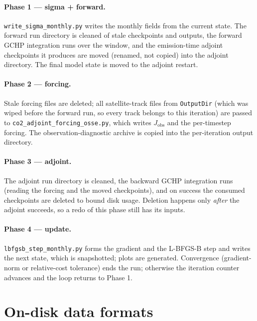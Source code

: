 \documentclass[11pt]{article}
\newcommand{\code}[1]{\texttt{#1}}
\begin{document}
\paragraph{Phase 1 --- sigma + forward.}
\code{write\_sigma\_monthly.py} writes the monthly fields from the current state.
The forward run directory is cleaned of stale checkpoints and outputs, the forward
GCHP integration runs over the window, and the emission-time adjoint checkpoints
it produces are moved (renamed, not copied) into the adjoint directory. The final
model state is moved to the adjoint restart.

\paragraph{Phase 2 --- forcing.}
Stale forcing files are deleted; all satellite-track files from \code{OutputDir}
(which was wiped before the forward run, so every track belongs to this iteration)
are passed to \code{co2\_adjoint\_forcing\_osse.py}, which writes $J_{\mathrm{obs}}$
and the per-timestep forcing. The observation-diagnostic archive is copied into the
per-iteration output directory.

\paragraph{Phase 3 --- adjoint.}
The adjoint run directory is cleaned, the backward GCHP integration runs (reading
the forcing and the moved checkpoints), and on success the consumed checkpoints are
deleted to bound disk usage. Deletion happens only \emph{after} the adjoint
succeeds, so a redo of this phase still has its inputs.

\paragraph{Phase 4 --- update.}
\code{lbfgsb\_step\_monthly.py} forms the gradient and the L-BFGS-B step and writes
the next state, which is snapshotted; plots are generated. Convergence
(gradient-norm or relative-cost tolerance) ends the run; otherwise the iteration
counter advances and the loop returns to Phase 1.

\section{On-disk data formats}
\label{sec:formats}
\end{document}
